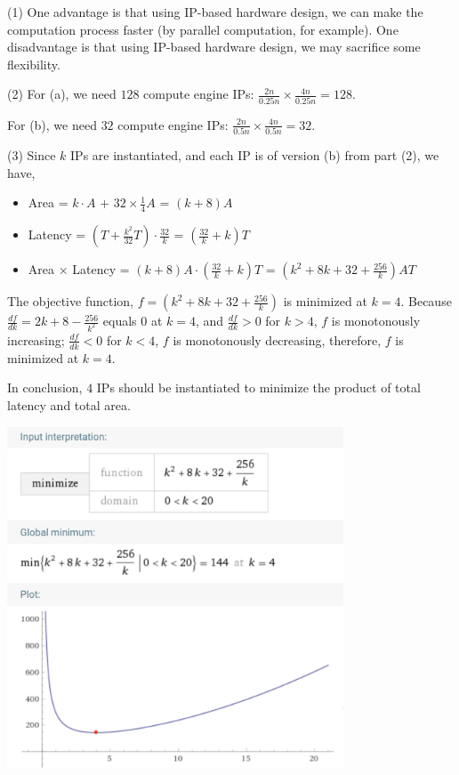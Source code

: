 \documentclass[11pt]{article}
\begin{document}



\begin{solution}
(1) One advantage is that using IP-based hardware design, we can make the computation process faster (by parallel computation, for example). One disadvantage is that using IP-based hardware design, we may sacrifice some flexibility. 
\item
(2) For (a), we need $128$ compute engine IPs: $\frac{2n}{0.25n} \times \frac{4n}{0.25n} = 128$.
\item For (b), we need $32$ compute engine IPs: $\frac{2n}{0.5n} \times \frac{4n}{0.5n} = 32$.
\item
(3) Since $k$ IPs are instantiated, and each IP is of version (b) from part (2), we have,
\begin{itemize}
\item Area = $k \cdot A$ + $32 \times \frac{1}{4} A$ = $(k + 8) A$
\item Latency = $(T + \frac{k^2}{32}T) \cdot \frac{32}{k}$ = $(\frac{32}{k} + k)T$
\item Area $\times$ Latency = $(k + 8) A \cdot (\frac{32}{k} + k)T$ = $(k^2+8k+32+\frac{256}{k})AT$
\end{itemize}
The objective function, $f = (k^2+8k+32+\frac{256}{k})$ is minimized at $k = 4$. Because $\frac{df}{dk} = 2k + 8 - \frac{256}{k^2}$ equals $0$ at $k = 4$, and $\frac{df}{dk} > 0$ for $k > 4$, $f$ is monotonously increasing; $\frac{df}{dk} < 0$ for $k < 4$, $f$ is monotonously decreasing, therefore, $f$ is minimized at $k = 4$.
\item In conclusion, $4$ IPs should be instantiated to minimize the product of total latency and total area.
\begin{center}
\includegraphics[width=10cm]{1.png}
\end{center}
\end{solution}
\end{document}
